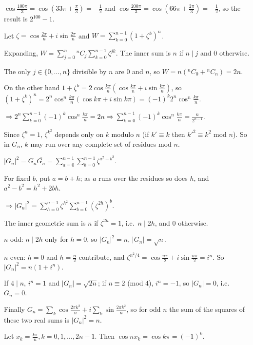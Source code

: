   $\cos\frac{100\pi}{3} = \cos\left(33\pi + \frac{\pi}{3}\right) = -\frac{1}{2}$ and $\cos\frac{200\pi}{3} =
  \cos\left(66\pi + \frac{2\pi}{3}\right) = -\frac{1}{2}$, so the result is $2^{100} - 1$.
\item Let $\zeta = \cos\frac{2\pi}{n} + i\sin\frac{2\pi}{n}$ and $W = \displaystyle\sum_{k = 0}^{n - 1}(1 +
  \zeta^k)^n$.

  Expanding, $W = \displaystyle\sum_{j = 0}^n{}^nC_j\sum_{k = 0}^{n - 1}\zeta^{jk}$. The inner sum is $n$ if
  $n\mid j$ and $0$ otherwise.

  The only $j\in\{0, \ldots, n\}$ divisible by $n$ are $0$ and $n$, so $W = n({}^nC_0 + {}^nC_n) = 2n$.

  On the other hand $1 + \zeta^k = 2\cos\frac{k\pi}{n}\left(\cos\frac{k\pi}{n} + i\sin\frac{k\pi}{n}\right)$, so
  $(1 + \zeta^k)^n = 2^n\cos^n\frac{k\pi}{n}(\cos k\pi + i\sin k\pi) = (-1)^k2^n\cos^n\frac{k\pi}{n}$.

  $\Rightarrow 2^n\displaystyle\sum_{k = 0}^{n - 1}(-1)^k\cos^n\frac{k\pi}{n} = 2n\Rightarrow\sum_{k = 0}^{n -
    1}(-1)^k\cos^n\frac{k\pi}{n} = \frac{n}{2^{n - 1}}$.
\item Since $\zeta^n = 1$, $\zeta^{k^2}$ depends only on $k$ modulo $n$ (if $k'\equiv k$ then $k'^2\equiv
  k^2$ mod $n$). So in $G_n$, $k$ may run over any complete set of residues mod $n$.

  $|G_n|^2 = G_n\overline{G_n} = \displaystyle\sum_{a = 0}^{n - 1}\sum_{b = 0}^{n - 1}\zeta^{a^2 - b^2}$.

  For fixed $b$, put $a = b + h$; as $a$ runs over the residues so does $h$, and $a^2 - b^2 = h^2 + 2bh$.

  $\Rightarrow|G_n|^2 = \displaystyle\sum_{h = 0}^{n - 1}\zeta^{h^2}\sum_{b = 0}^{n - 1}\left(\zeta^{2h}\right)^b$.

  The inner geometric sum is $n$ if $\zeta^{2h} = 1$, i.e.\ $n\mid 2h$, and $0$ otherwise.

  $n$ odd: $n\mid 2h$ only for $h = 0$, so $|G_n|^2 = n$, $|G_n| = \sqrt{n}$.

  $n$ even: $h = 0$ and $h = \frac{n}{2}$ contribute, and $\zeta^{n^2/4} = \cos\frac{n\pi}{2} +
  i\sin\frac{n\pi}{2} = i^n$. So $|G_n|^2 = n(1 + i^n)$.

  If $4\mid n$, $i^n = 1$ and $|G_n| = \sqrt{2n}$; if $n\equiv 2$ (mod $4$), $i^n = -1$, so $|G_n| = 0$, i.e.\
  $G_n = 0$.

  Finally $G_n = \displaystyle\sum_k\cos\frac{2\pi k^2}{n} + i\sum_k\sin\frac{2\pi k^2}{n}$, so for odd $n$
  the sum of the squares of these two real sums is $|G_n|^2 = n$.
\item Let $x_k = \frac{k\pi}{n}, k = 0, 1, \ldots, 2n - 1$. Then $\cos nx_k = \cos k\pi = (-1)^k$.

